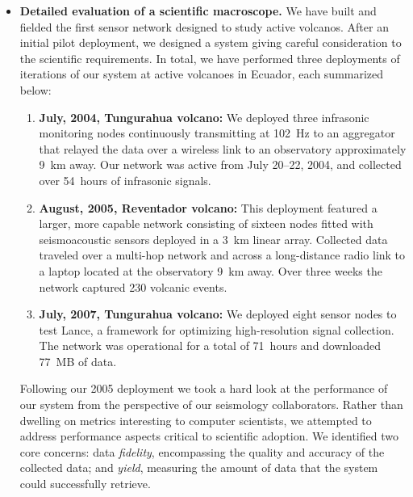 \begin{itemize}

\vspace*{-0.1in}

\item \textbf{Detailed evaluation of a scientific macroscope.} We have built
and fielded the first sensor network designed to study active volcanos. After
an initial pilot deployment, we designed a system giving careful
consideration to the scientific requirements. In total, we have performed
three deployments of iterations of our system at active volcanoes in Ecuador,
each summarized below:

\vspace*{-0.1in}

\begin{enumerate}

\item \textbf{July, 2004, Tungurahua volcano:} We deployed three infrasonic
monitoring nodes continuously transmitting at 102~Hz to an aggregator that
relayed the data over a wireless link to an observatory approximately 9~km
away. Our network was active from July 20--22, 2004, and collected over
54~hours of infrasonic signals.

\item \textbf{August, 2005, Reventador volcano:} This deployment featured a
larger, more capable network consisting of sixteen nodes fitted with
seismoacoustic sensors deployed in a 3~km linear array. Collected data
traveled over a multi-hop network and across a long-distance radio link to a
laptop located at the observatory 9~km away. Over three weeks the network
captured 230 volcanic events.

\item \textbf{July, 2007, Tungurahua volcano:} We deployed eight
sensor nodes to test Lance, a framework for optimizing high-resolution signal
collection. The network was operational for a total of 71~hours and
downloaded 77~MB of data.

\end{enumerate}

\vspace*{-0.1in}

Following our 2005 deployment we took a hard look at the performance of our
system from the perspective of our seismology collaborators. Rather than
dwelling on metrics interesting to computer scientists, we attempted to
address performance aspects critical to scientific adoption. We identified
two core concerns: data \textit{fidelity}, encompassing the quality and
accuracy of the collected data; and \textit{yield}, measuring the amount of
data that the system could successfully retrieve.


\end{itemize}
